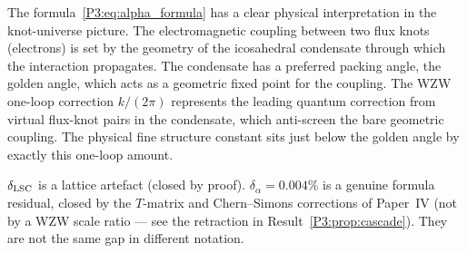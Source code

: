 \begin{remark}
\label{P3:rem:alpha_physical_interp}
The formula~\eqref{P3:eq:alpha_formula} has a clear physical
interpretation in the knot-universe picture.  The electromagnetic
coupling between two flux knots (electrons) is set by the geometry
of the icosahedral condensate through which the interaction propagates.
The condensate has a preferred packing angle, the golden angle,
which acts as a geometric fixed point for the coupling.  The WZW
one-loop correction $k/(2\pi)$ represents the leading quantum
correction from virtual flux-knot pairs in the condensate, which
anti-screen the bare geometric coupling.
The physical fine structure constant sits just below the golden angle
by exactly this one-loop amount.
\end{remark}

\begin{remark}
\label{P3:rem:two_gaps_independent}
$\delta_{\mathrm{LSC}}$ is a lattice artefact (closed by proof).
$\delta_\alpha = 0.004\%$ is a genuine formula residual, closed by the
$T$-matrix and Chern--Simons corrections of Paper~IV (not by a WZW
scale ratio --- see the retraction in Result~\ref{P3:prop:cascade}).
They are not the same gap in different notation.
\end{remark}


